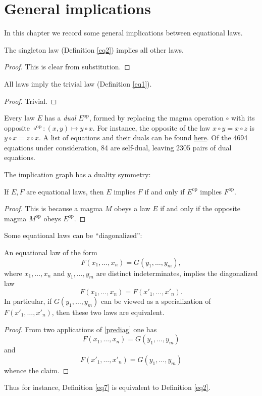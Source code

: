 \chapter{General implications}

In this chapter we record some general implications between equational laws.

\begin{theorem}\label{singleton-all}  The singleton law (Definition \ref{eq2}) implies all other laws.
\end{theorem}

\begin{proof} This is clear from substitution.
\end{proof}

\begin{theorem}\label{all-trivial}  All laws imply the trivial law (Definition \ref{eq1}).
\end{theorem}

\begin{proof} Trivial.
\end{proof}

Every law $E$ has a \emph{dual} $E^{\mathrm{op}}$, formed by replacing the magma operation $\circ$ with its opposite $\circ^{\mathrm{op}}:(x,y) \mapsto y \circ x$.  For instance, the opposite of the law $x \circ y = x \circ z$ is $y \circ x = z \circ x$.  A list of equations and their duals can be found \href{https://github.com/teorth/equational_theories/blob/main/data/dual_equations.md}{here}.  Of the 4694 equations under consideration, 84 are self-dual, leaving 2305 pairs of dual equations.

The implication graph has a duality symmetry:

\begin{theorem}[Duality]\label{duality}  If $E,F$ are equational laws, then $E$ implies $F$ if and only if $E^{\mathrm{op}}$ implies $F^{\mathrm{op}}$.
\end{theorem}

\begin{proof} This is because a magma $M$ obeys a law $E$ if and only if the opposite magma $M^{\mathrm{op}}$ obeys $E^{\mathrm{op}}$.
\end{proof}

Some equational laws can be ``diagonalized'':

\begin{theorem}[Diagonalization]\label{diag}  An equational law of the form
  \begin{equation}\label{prediag} F(x_1,\dots,x_n) = G(y_1,\dots,y_m),
  \end{equation}
  where $x_1,\dots,x_n$ and $y_1,\dots,y_m$ are distinct indeterminates, implies the diagonalized law
$$ F(x_1,\dots,x_n) = F(x'_1,\dots,x'_n).$$
In particular, if $G(y_1,\dots,y_m)$ can be viewed as a specialization of $F(x'_1,\dots,x'_n)$, then these two laws are equivalent.
\end{theorem}

\begin{proof}  From two applications of \eqref{prediag} one has
$$ F(x_1,\dots,x_n) = G(y_1,\dots,y_m)$$
and
$$ F(x'_1,\dots,x'_n) = G(y_1,\dots,y_m)$$
whence the claim.
\end{proof}

Thus for instance, Definition \ref{eq7} is equivalent to Definition \ref{eq2}.

